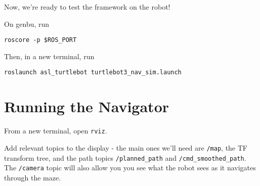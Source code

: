 \documentclass{article}
\begin{document}
Now, we're ready to test the framework on the robot!




On genbu, run

\begin{lstlisting}
roscore -p $ROS_PORT
\end{lstlisting}

Then, in a new terminal, run

\begin{lstlisting}
roslaunch asl_turtlebot turtlebot3_nav_sim.launch
\end{lstlisting}


\section{Running the Navigator}

From a new terminal, open \texttt{rviz}. 

Add relevant topics to the display - the main ones we'll need are \texttt{/map}, the TF transform tree, and the path topics \texttt{/planned\_path} and \texttt{/cmd\_smoothed\_path}. The \texttt{/camera} topic will also allow you you see what the robot sees as it navigates through the maze.
\end{document}
